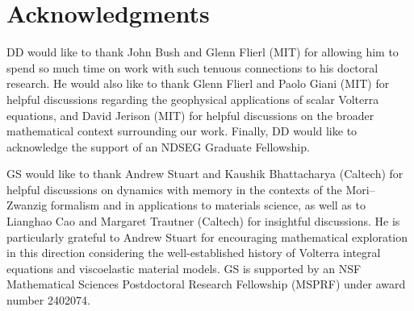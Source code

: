 \documentclass{cams-l} %
\newcommand{\dave}[1]{#1}\newcommand{\davebegin}{}\newcommand{\daveend}{}\newcommand{\george}[1]{#1}
\theoremstyle{definition}
\theoremstyle{remark}
\numberwithin{equation}{section}
\begin{document}

\section*{Acknowledgments}
DD would like to thank John Bush and Glenn Flierl (MIT) for allowing him to spend so much time on work with such tenuous connections to his doctoral research. He would also like to thank Glenn Flierl and Paolo Giani (MIT) for helpful discussions regarding the geophysical applications of scalar Volterra equations, \dave{and David Jerison (MIT) for helpful discussions on the broader mathematical context surrounding our work}. Finally, DD would like to acknowledge the support of an NDSEG Graduate Fellowship.

GS would like to thank Andrew Stuart and Kaushik Bhattacharya (Caltech) for helpful discussions on dynamics with memory in the contexts of the Mori--Zwanzig formalism and in applications to materials science, as well as to Lianghao Cao and Margaret Trautner (Caltech) for insightful discussions. He is particularly grateful to Andrew Stuart for encouraging mathematical exploration in this direction considering the well-established history of Volterra integral equations and viscoelastic material models. GS is supported by an NSF Mathematical Sciences Postdoctoral Research Fellowship (MSPRF) under award number 2402074.



\end{document}
